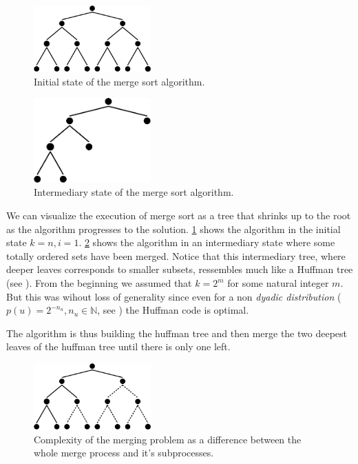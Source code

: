 \begin{figure}
	\centering
	\includegraphics[width=0.4\textwidth]{fig/merging/huffman-1-trim}
	\caption{\label{tree:merging:fig/huffman-1} Initial state of the merge sort algorithm.}
\end{figure}

\begin{figure}
	\centering
	\includegraphics[width=0.4\textwidth]{fig/merging/huffman-3-trim}
	\caption{\label{tree:merging:fig/huffman-3} Intermediary state of the merge sort algorithm.}
\end{figure}

We can visualize the execution of merge sort as a tree that shrinks up to the root as the algorithm progresses to the solution. \ref{tree:merging:fig/huffman-1} shows the algorithm in the initial state $k = n, i = 1$. \ref{tree:merging:fig/huffman-3} shows the algorithm in an intermediary state where some totally ordered sets have been merged. Notice that this intermediary tree, where deeper leaves corresponds to smaller subsets, ressembles much like a Huffman tree (see \cite{huffman1952method}). From the beginning we assumed that $k = 2^m$ for some natural integer $m$. But this was wihout loss of generality since even for a non \emph{dyadic distribution} ($p(u) = 2^{-n_u}, n_u \in \mathbb{N}$, see \cite{cover2012elements}) the Huffman code is optimal.

The algorithm is thus building the huffman tree and then merge the two deepest leaves of the huffman tree until there is only one left.

\begin{figure}
	\centering
	\includegraphics[width=0.4\textwidth]{fig/merging/huffman-2-trim}
	\caption{\label{tree:merging:fig/huffman-2} Complexity of the merging problem as a difference between the whole merge process and it's subprocesses.}
\end{figure}

